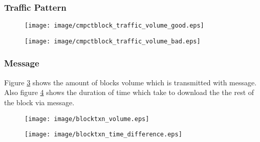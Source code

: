 \subsubsection{Traffic Pattern}
\begin{figure}
\centering
\texttt{[image: image/cmpctblock\_traffic\_volume\_good.eps]}
\caption{}
\label{fig:cmpctblock_traffic_volume_detectable}
\end{figure}

\begin{figure}
\centering
\texttt{[image: image/cmpctblock\_traffic\_volume\_bad.eps]}
\caption{}
\label{fig:cmpctblock_traffic_volume_undetectable}
\end{figure}

\subsubsection{ Message}
Figure \ref{fig:blocktxn_volume} shows the amount of blocks volume which is transmitted with  message. Also figure \ref{fig:blocktxn_time_difference} shows the duration of time which take to download the the rest of the block via  message. 

\begin{figure}
\centering
\texttt{[image: image/blocktxn\_volume.eps]}
\caption{}
\label{fig:blocktxn_volume}
\end{figure}

\begin{figure}
\centering
\texttt{[image: image/blocktxn\_time\_difference.eps]}
\caption{}
\label{fig:blocktxn_time_difference}
\end{figure}



